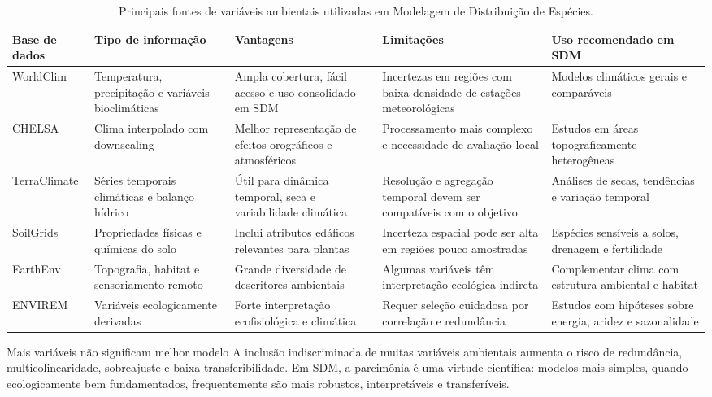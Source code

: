 \begin{table}[H]
	\centering
	\caption{Principais fontes de variáveis ambientais utilizadas em Modelagem de Distribuição de Espécies.}
	\label{tab:fontes_variaveis_ambientais}
	\small
	\begin{tabular}{p{2.6cm}p{3.0cm}p{3.5cm}p{3.5cm}p{3.5cm}}
		\toprule
		\textbf{Base de dados} & \textbf{Tipo de informação} & \textbf{Vantagens} & \textbf{Limitações} & \textbf{Uso recomendado em SDM} \\
		\midrule
		WorldClim & Temperatura, precipitação e variáveis bioclimáticas & Ampla cobertura, fácil acesso e uso consolidado em SDM & Incertezas em regiões com baixa densidade de estações meteorológicas & Modelos climáticos gerais e comparáveis \\
		CHELSA & Clima interpolado com downscaling & Melhor representação de efeitos orográficos e atmosféricos & Processamento mais complexo e necessidade de avaliação local & Estudos em áreas topograficamente heterogêneas \\
		TerraClimate & Séries temporais climáticas e balanço hídrico & Útil para dinâmica temporal, seca e variabilidade climática & Resolução e agregação temporal devem ser compatíveis com o objetivo & Análises de secas, tendências e variação temporal \\
		SoilGrids & Propriedades físicas e químicas do solo & Inclui atributos edáficos relevantes para plantas & Incerteza espacial pode ser alta em regiões pouco amostradas & Espécies sensíveis a solos, drenagem e fertilidade \\
		EarthEnv & Topografia, habitat e sensoriamento remoto & Grande diversidade de descritores ambientais & Algumas variáveis têm interpretação ecológica indireta & Complementar clima com estrutura ambiental e habitat \\
		ENVIREM & Variáveis ecologicamente derivadas & Forte interpretação ecofisiológica e climática & Requer seleção cuidadosa por correlação e redundância & Estudos com hipóteses sobre energia, aridez e sazonalidade \\
		\bottomrule
	\end{tabular}
\end{table}

\begin{caixaatencao}{Mais variáveis não significam melhor modelo}
	A inclusão indiscriminada de muitas variáveis ambientais aumenta o risco de redundância, multicolinearidade, sobreajuste e baixa transferibilidade. Em SDM, a parcimônia é uma virtude científica: modelos mais simples, quando ecologicamente bem fundamentados, frequentemente são mais robustos, interpretáveis e transferíveis.
\end{caixaatencao}

